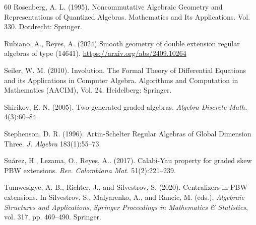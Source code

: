 \documentclass{amsart}
\theoremstyle{definition}
\theoremstyle{remark}
\numberwithin{equation}{section}
\begin{document}
\begin{thebibliography}{60}
 Rosenberg, A. L. (1995). Noncommutative Algebraic Geometry and Representations of Quantized Algebras. Mathematics and Its Applications. Vol. 330. Dordrecht: Springer.

 Rubiano, A., Reyes, A. (2024) Smooth geometry of double extension regular algebras of type (14641). \url{https://arxiv.org/abs/2409.10264}



 Seiler, W. M. (2010). Involution. {T}he {F}ormal {T}heory of {D}ifferential {E}quations and its {A}pplications in {C}omputer {A}lgebra. Algorithms and Computation in Mathematics (AACIM), Vol. 24. Heidelberg: Springer.

 Shirikov, E. N. (2005). Two-generated graded algebras. {\em Algebra Discrete Math.} 4(3):60--84.





 Stephenson, D. R. (1996). Artin-Schelter Regular Algebras of Global Dimension Three. {\em J. Algebra} 183(1):55--73.

 Su\'arez, H., Lezama, O., Reyes, A.. (2017). Calabi-{Y}au property for graded skew PBW extensions. {\em Rev. Colombiana Mat.} 51(2):221--239.

 Tumwesigye, A. B., Richter, J., and Silvestrov, S. (2020). Centralizers in PBW extensions. In Silvestrov, S., Malyarenko, A., and Rancic, M. (eds.), {\em Algebraic Structures and Applications}, {\em Springer Proceedings in Mathematics \& Statistics}, vol. 317, pp. 469--490. Springer.


\end{thebibliography}
\end{document}
